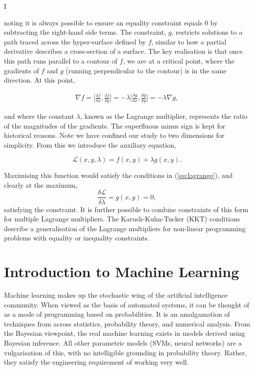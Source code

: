 \documentclass[11pt]{amsart}
\begin{document}
I

noting it is always possible to ensure an equality constraint equals 0 by subtracting the right-hand side terms. The constraint, $g$, restricts solutions to a path traced across the hyper-surface defined by $f$, similar to how a partial derivative describes a cross-section of a surface. The key realisation is that once this path runs parallel to a contour of $f$, we are at a critical point, where the gradients of $f$ and $g$ (running perpendicular to the contour) is in the same direction. At this point,

\begin{align}\nabla f = \bigg[\frac{\delta f}{\delta x}, \frac{\delta f}{\delta y}\bigg] = -\lambda\bigg[\frac{\delta g}{\delta x}, \frac{\delta g}{\delta y}\bigg] = -\lambda\nabla g \label{eq:lagrange},
\end{align}

and where the constant $\lambda$, known as the Lagrange multiplier, represents the ratio of the magnitudes of the gradients. The superfluous minus sign is kept for historical reasons. Note we have confined our study to two dimensions for simplicity. From this we introduce the auxiliary equation,

$$\mathcal{L}(x, y, \lambda) = f(x, y) + \lambda g(x, y).$$

Maximising this function would satisfy the conditions in (\ref{eq:lagrange}), and clearly at the maximum, $$\frac{\delta\mathcal{L}}{\delta\lambda} = g(x, y) = 0,$$ satisfying the constraint. It is further possible to combine constraints of this form for multiple Lagrange multipliers. The Karush-Kuhn-Tucker (KKT) conditions describe a generalisation of the Lagrange multipliers for non-linear programming problems with equality or inequality constraints.

\section{Introduction to Machine Learning}

Machine learning makes up the stochastic wing of the artificial intelligence community. When viewed as the basis of automated systems, it can be thought of as a mode of programming based on probabilities. It is an amalgamation of techniques from across statistics, probability theory, and numerical analysis. From the Bayesian viewpoint, the real machine learning exists in models derived using Bayesian inference. All other parametric models (SVMs, neural networks) are a vulgarisation of this, with no intelligible grounding in probability theory. Rather, they satisfy the engineering requirement of working very well.
\end{document}
